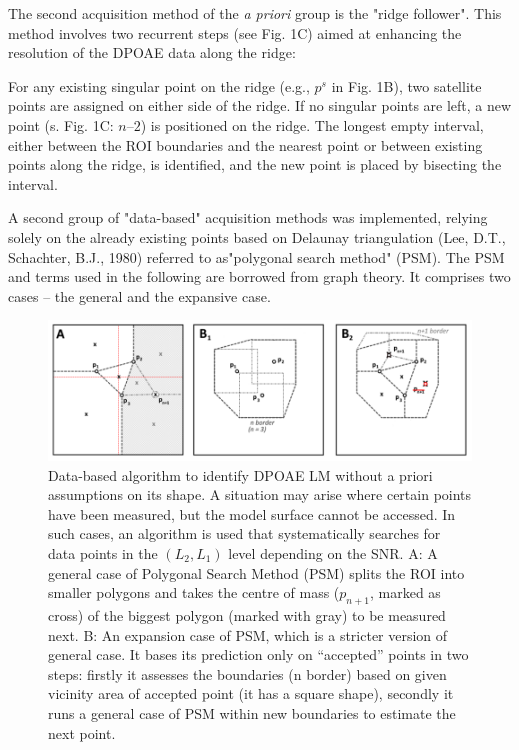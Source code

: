 \documentclass[journal,twoside,web]{ieeecolor2}
\begin{document}
The second acquisition method of the \textit{a priori} group is the "ridge follower". This method involves two recurrent steps (see Fig. 1C) aimed at enhancing the resolution of the DPOAE data along the ridge:
\begin{algorithmic}[1]
\STATE For any existing singular point on the ridge (e.g., $p^s$ in Fig. 1B), two satellite points are assigned on either side of the ridge.
\STATE If no singular points are left, a new point (s. Fig. 1C: $n – 2$) is positioned on the ridge. The longest empty interval, either between the ROI boundaries and the nearest point or between existing points along the ridge, is identified, and the new point is placed by bisecting the interval.
\end{algorithmic} 

A second group of "data-based" acquisition methods was implemented, relying solely on the already existing points based on Delaunay triangulation (Lee, D.T., Schachter, B.J., 1980) referred to as"polygonal search method" (PSM). The PSM and terms used in the following are borrowed from graph theory. It comprises two cases – the general and the expansive case.

\begin{figure}
\includegraphics[width=\textwidth]{Fig_ALM_DataBased} %
\caption{Data-based algorithm to identify DPOAE LM without a priori assumptions on its shape. A situation may arise where certain points have been measured, but the model surface cannot be accessed. In such cases, an algorithm is used that systematically searches for data points in the $(L_2, L_1)$ level depending on the SNR. A: A general case of Polygonal Search Method (PSM) splits the ROI into smaller polygons and takes the centre of mass ($p_{n+1}$, marked as cross) of the biggest polygon (marked with gray) to be measured next. B: An expansion case of PSM, which is a stricter version of general case. It bases its prediction only on “accepted” points in two steps: firstly it assesses the boundaries (n border) based on given vicinity area of accepted point (it has a square shape), secondly it runs a general case of PSM within new boundaries to estimate the next point.}
\label{fig_ADB}
\end{figure}
\end{document}
